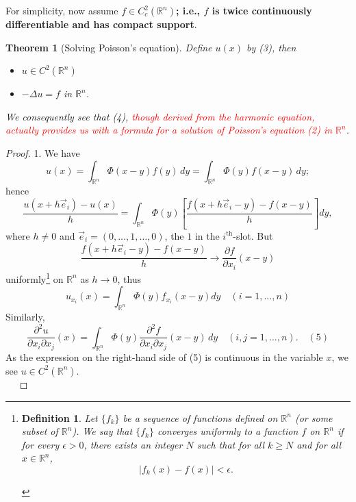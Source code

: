 \documentclass[a4paper,12pt]{report}
\newtheorem{theorem}{Theorem}[section]
\newtheorem{definition}{Definition}[section]
\begin{document}
\noindent
For simplicity, now assume \textbf{$f \in C_c^2(\mathbb{R}^n)$; i.e., $f$ is twice continuously differentiable and has compact support}.
\begin{theorem}[Solving Poisson's equation]
Define \(u(x)\) by (3), then 
\begin{itemize}
    \item[(i)] \( u \in C^2(\mathbb{R}^n) \)
    \item[(ii)] \( -\Delta u = f \) in \( \mathbb{R}^n \).
\end{itemize}
We consequently see that (4), \textcolor{red}{though derived from the harmonic equation, actually provides us with a formula for a solution of Poisson’s equation (2) in \( \mathbb{R}^n \)}.
\end{theorem}
\begin{proof}
1. We have
\[
u(x) = \int_{\mathbb{R}^n} \Phi(x - y) f(y) \, dy = \int_{\mathbb{R}^n} \Phi(y) f(x - y) \, dy;
\]
hence
\[
\frac{u(x + h \vec{e}_i) - u(x)}{h} = \int_{\mathbb{R}^n} \Phi(y) \left[ \frac{f(x + h \vec{e}_i - y) - f(x - y)}{h} \right] dy,
\]
where \( h \neq 0 \) and \( \vec{e}_i = (0, \ldots, 1, \ldots, 0) \), the \( 1 \) in the \( i^{\text{th}} \)-slot. 
\newpage
\noindent
But
\[
\frac{f(x + h \vec{e}_i - y) - f(x - y)}{h} \to \frac{\partial f}{\partial x_i} (x - y)
\]
uniformly\footnote{
\begin{definition}
Let \( \{f_k\} \) be a sequence of functions defined on \( \mathbb{R}^n \) (or some subset of \( \mathbb{R}^n \)). We say that \( \{f_k\} \) converges uniformly to a function \( f \) on \( \mathbb{R}^n \) if for every \( \epsilon > 0 \), there exists an integer \( N \) such that for all \( k \geq N \) and for all \( x \in \mathbb{R}^n \),
\[
\left| f_k(x) - f(x) \right| < \epsilon.
\]
\end{definition}
} on \(\mathbb{R}^n\) as \( h \to 0 \), thus 
\[u_{x_i} (x) = \int_{\mathbb{R}^n} \Phi (y) f_{x_i} (x-y)dy \quad (i = 1, ..., n) \]
Similarly, 
\[
\frac{\partial^2 u}{\partial x_i \partial x_j}(x) = \int_{\mathbb{R}^n} \Phi(y) \frac{\partial^2 f}{\partial x_i \partial x_j}(x - y) \, dy \quad (i, j = 1, \ldots, n). \quad (5)
\]
As the expression on the right-hand side of (5) is continuous in the variable \( x \), we see \( u \in C^2(\mathbb{R}^n) \).\\
\(\quad\)


\end{proof}
\end{document}
